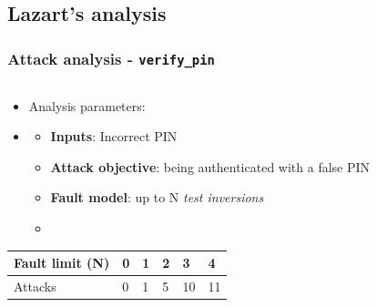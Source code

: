 \subsection{Lazart's analysis}

\begin{frame}[fragile] \frametitle{Attack analysis - \texttt{verify\_pin}}
{\small
    \begin{columns}
        \begin{column}{0.60\textwidth}
            \begin{itemize}
                \item Analysis parameters:
                \item[]
                \begin{itemize}
                	\item \textbf{Inputs}: Incorrect PIN
                	\item \textbf{Attack objective}: being authenticated with a false PIN
                	\item \textbf{Fault model}: up to N \textit{test inversions}
                 \item[]
                \end{itemize}
            \end{itemize}        
            
            \begin{center}
                \begin{table}[]
                    \begin{tabular}{|l|l|l|l|l|l|}
                    \hline
                    \rowcolor[HTML]{C0C0C0} 
                    Fault limit (N)                           & 0                         & 1                         & 2                         & 3                          & 4                          \\ \hline
                    \rowcolor[HTML]{FFCCC9} 
                    \cellcolor[HTML]{C0C0C0}Attacks & \cellcolor[HTML]{9AFF99}0 & 1                         & 5                         & 10  & 11                          \\ \hline
                    \end{tabular}
                \end{table}
            \end{center}

            

\end{column}
\end{columns}}
\end{frame}
